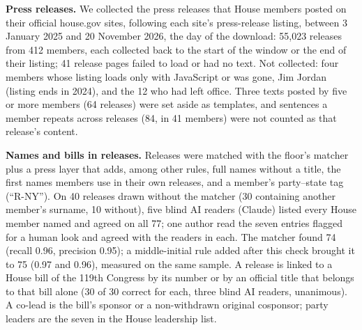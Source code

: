 
\textbf{Press releases.} We collected the press releases that House members posted on their official house.gov sites, following each site's press-release listing, between 3 January 2025 and 20 November 2026, the day of the download: 55,023 releases from 412 members, each collected back to the start of the window or the end of their listing; 41 release pages failed to load or had no text. Not collected: four members whose listing loads only with JavaScript or was gone, Jim Jordan (listing ends in 2024), and the 12 who had left office. Three texts posted by five or more members (64 releases) were set aside as templates, and sentences a member repeats across releases (84, in 41 members) were not counted as that release's content.

\textbf{Names and bills in releases.} Releases were matched with the floor's matcher plus a press layer that adds, among other rules, full names without a title, the first names members use in their own releases, and a member's party--state tag (``R-NY''). On 40 releases drawn without the matcher (30 containing another member's surname, 10 without), five blind AI readers (Claude) listed every House member named and agreed on all 77; one author read the seven entries flagged for a human look and agreed with the readers in each. The matcher found 74 (recall 0.96, precision 0.95); a middle-initial rule added after this check brought it to 75 (0.97 and 0.96), measured on the same sample. A release is linked to a House bill of the 119th Congress by its number or by an official title that belongs to that bill alone (30 of 30 correct for each, three blind AI readers, unanimous). A co-lead is the bill's sponsor or a non-withdrawn original cosponsor; party leaders are the seven in the House leadership list.

